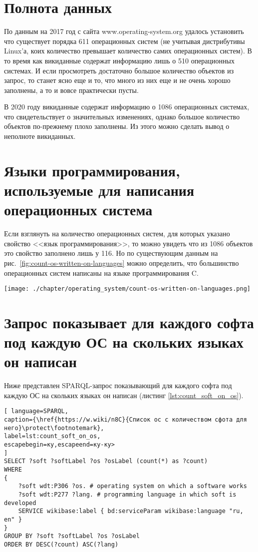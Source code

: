 \section{Полнота данных}
По данным на 2017 год с сайта www.operating-system.org удалось установить что существует порядка 611 операционных систем (не учитывая дистрибутивы Linux'а, коих количество превышает количество самих операционных систем). В то время как викиданные содержат информацию лишь о 510 операционных системах. И если просмотреть достаточно большое количество объектов из запрос, то станет ясно еще и то, что много из них еще и не очень хорошо заполнены, а то и вовсе практически пусты.

В 2020 году викиданные содержат информацию о 1086 операционных системах, что свидетельствует о значительных изменениях, однако большое количество объектов по-прежнему плохо заполнены. Из этого можно сделать вывод о неполноте викиданных.

\section{Языки программирования, используемые для написания операционных система}
Если взглянуть на количество операционных систем, для которых указано свойство <<язык программирования>>, то можно увидеть что из 1086 объектов это свойство заполнено лишь у 116. Но по существующим данным на рис.~\ref{fig:count-os-written-on-languages} можно определить, что большинство операционных систем написаны на языке программирования C. 
\begin{figure*}[h!]
	\texttt{[image: ./chapter/operating\_system/count-os-written-on-languages.png]}
	\caption{Количество операционных систем, написанных на языках программирования (данные на 2020 год.)}
	\label{fig:count-os-written-on-languages}
\end{figure*}


\section{Запрос показывает для каждого софта под каждую ОС на скольких языках он написан}
Ниже представлен SPARQL-запрос показывающий для каждого софта под каждую ОС на скольких языках он написан (листинг \ref{lst:count_soft_on_os}).

\begin{lstlisting}[ language=SPARQL, 
caption={\href{https://w.wiki/n8C}{Список ос с количеством сфота для него}\protect\footnotemark},
label=lst:count_soft_on_os, 
escapebegin=ку,escapeend=ку-ку>
]
SELECT ?soft ?softLabel ?os ?osLabel (count(*) as ?count)
WHERE
{
	?soft wdt:P306 ?os. # operating system on which a software works
	?soft wdt:P277 ?lang. # programming language in which soft is developed
	SERVICE wikibase:label { bd:serviceParam wikibase:language "ru, en" }
}
GROUP BY ?soft ?softLabel ?os ?osLabel
ORDER BY DESC(?count) ASC(?lang)
\end{lstlisting}


